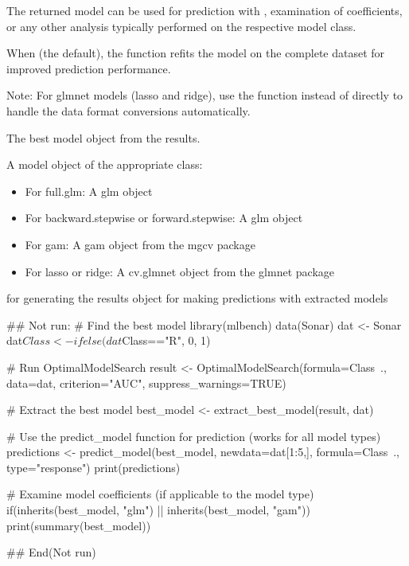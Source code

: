 \documentclass[a4paper]{book}
\begin{document}
%
\begin{Details}
The returned model can be used for prediction with , examination
of coefficients, or any other analysis typically performed on the respective model class.

When  (the default), the function refits the model on the complete dataset
for improved prediction performance.

Note: For glmnet models (lasso and ridge), use the  function 
instead of  directly to handle the data format conversions automatically.
\end{Details}
%
\begin{Value}
The best model object from the results.

A model object of the appropriate class:
\begin{itemize}

\item{} For full.glm: A glm object
\item{} For backward.stepwise or forward.stepwise: A glm object
\item{} For gam: A gam object from the mgcv package
\item{} For lasso or ridge: A cv.glmnet object from the glmnet package

\end{itemize}

\end{Value}
%
\begin{SeeAlso}
 for generating the results object
 for making predictions with extracted models
\end{SeeAlso}
%
\begin{Examples}
\begin{ExampleCode}
## Not run: 
# Find the best model
library(mlbench)
data(Sonar)
dat <- Sonar
dat$Class <- ifelse(dat$Class=="R", 0, 1)

# Run OptimalModelSearch
result <- OptimalModelSearch(formula=Class~., data=dat,
                           criterion="AUC", suppress_warnings=TRUE)
                           
# Extract the best model
best_model <- extract_best_model(result, dat)

# Use the predict_model function for prediction (works for all model types)
predictions <- predict_model(best_model, newdata=dat[1:5,], 
                            formula=Class~., type="response")
print(predictions)

# Examine model coefficients (if applicable to the model type)
if(inherits(best_model, "glm") || inherits(best_model, "gam")) {
  print(summary(best_model))
}

## End(Not run)
\end{ExampleCode}
\end{Examples}
\end{document}
